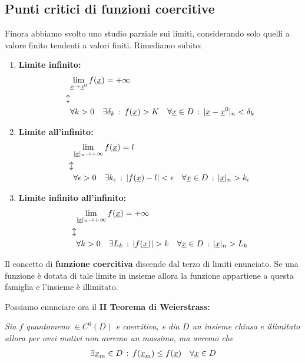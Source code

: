 \subsection{Punti critici di funzioni coercitive}

Finora abbiamo svolto uno studio parziale sui limiti, considerando solo quelli a valore finito tendenti a valori finiti. Rimediamo subito:

\begin{enumerate}
	\item \textbf{Limite infinito:}
	\begin{align}
		{}&\underset{\underline{x} \rightarrow \underline{x}^0}{\lim} \, f(\underline{x})= +\infty  \\
		\updownarrow \nonumber \\ 
		&\forall k>0 \quad \exists \delta_k \, : \, f(\underline{x})>K \quad \forall \underline{x} \in D \, : \, |\underline{x} - \underline{x}^0|_n < \delta_k
	\end{align}
	
	\item \textbf{Limite all'infinito:}
	\begin{align}
		{}&\underset{|\underline{x}|_n \rightarrow +\infty}{\lim} \, f(\underline{x})= l  \\
		\updownarrow \nonumber \\ 
		&\forall \epsilon>0 \quad \exists k_\epsilon \, : \, \left| f(\underline{x})-l \right|<\epsilon \quad \forall \underline{x} \in D \, : \, |\underline{x}|_n >k_\epsilon
	\end{align}
	
	\item \textbf{Limite infinito all'infinito:}
	\begin{align}
		{}&\limit{|\vecx|_n}{+\infty} f(\vecx)= +\infty  \\
		\updownarrow \continue 
		&\forall k>0 \quad \exists L_k \taleche \absval{f(\vecx)}>k \quad \forall \vecx \in D \taleche |\vecx|_n >L_k
	\end{align}
\end{enumerate}


Il concetto di \textbf{funzione coercitiva} discende dal terzo di limiti enunciato. Se una funzione è dotata di tale limite in insieme allora la funzione appartiene a questa famiglia e l'insieme è illimitato. 

Possiamo enunciare ora il \textbf{II Teorema di Weierstrass:}

\bigskip

\textit{Sia $f$ quantomeno $\in C^0(D)$ e coercitiva, e dia $D$ un insieme chiuso e illimitato allora per ovvi motivi non avremo un massimo, ma avremo che}
\begin{align}
	\exists \underline{x}_m \in D \, : \, f(\underline{x}_m) \leq f(\underline{x}) \quad \forall \underline{x} \in D
\end{align} 

